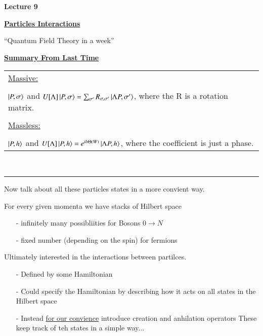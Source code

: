 \def\adagger{\ensuremath{a_{p\sigma}^\dagger}}


\usepackage{fancyhdr}

\fancyhf{}


\thispagestyle{fancy}

\begin{center}
{\huge \textbf{Lecture 9}}
\end{center}

{\fontsize{14}{16}\selectfont

\textbf{\underline{Particles Interactions}} 

``Quantum Field Theory in a week''

{\Large \underline{\textbf{Summary From Last Time}}}

\begin{tabular}{l}
\underline{Massive:}\\
\\
\hspace{0.5in}$\ket{P, \sigma}$ and $U[\Lambda] \ket{P, \sigma} = \sum_{\sigma'} R_{\sigma,\sigma'} \ket{\Lambda P, \sigma'}$, where the R is a rotation matrix.\\
\\
\underline{Massless:}\\
\\
\hspace{0.5in}$\ket{P, h}$ and $U[\Lambda] \ket{P, h} = e^{ih\Theta(W)}\ket{\Lambda P, h}$, where the coefficient is just a phase.\\
\end{tabular}\\

\noindent\rule{\textwidth}{1pt}
Now talk about all these particles states in a more convient way.  

For every given momenta we have stacks of Hilbert space
\begin{itemize}
\item[-] infinitely many possibliities for Bosons $0\rightarrow N$
\item[-] fixed number (depending on the spin) for fermions
\end{itemize}

\vspace{0.5in}
Ultimately interested in the interactions between partilces. 
\begin{itemize}
\item[-] Defined by some Hamiltonian        
\item[-] Could specify the Hamiltonian by describing how it acts on all states in the Hilbert space
\item[-] Instead \underline{for our convience} introduce creation and anhilation operators
These keep track of teh states in a simple way...
\end{itemize}

}

